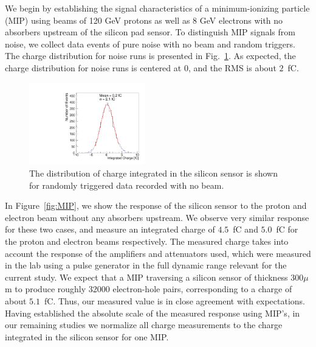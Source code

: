 \documentclass[12pt]{article}
\begin{document}
{We begin by establishing the signal characteristics of a minimum-ionizing
particle (MIP) using beams of 120 GeV protons as well as 8 GeV electrons with no
absorbers upstream of the silicon pad sensor. To distinguish MIP signals from
noise, we collect data events of pure noise with no beam and random triggers.
The charge distribution for noise runs is presented in
Fig.~\ref{fig:noise}. As expected, the charge distribution for noise
runs is centered at 0, and the RMS is about $2$~fC. 

\begin{figure}[htbp] 
\centering
\includegraphics[width=0.45\textwidth]{plots/NoiseNoBeam_charge.pdf} 
\caption{The distribution of charge integrated in the silicon sensor is shown for randomly triggered 
data recorded with no beam. } 
\label{fig:noise} 
\end{figure} 

In Figure~\ref{fig:MIP}, we show the response of the silicon sensor to
the proton and electron beam without any absorbers upstream. We observe very similar
response for these two cases, and measure an integrated charge of $4.5$~fC and $5.0$~fC
for the proton and electron beams respectively. The measured charge takes into account
the response of the amplifiers and attenuators used, which were measured 
in the lab using a pulse generator in the full dynamic range relevant for the current study.
We expect that a MIP traversing a silicon sensor of thickness 300$\mu$m to produce roughly 32000 
electron-hole pairs, corresponding to a charge of about $5.1$~fC. Thus, our measured value
is in close agreement with expectations. Having established the absolute scale of the measured 
response using MIP's, in our remaining studies we normalize all charge measurements to the 
charge integrated in the silicon sensor for one MIP. 

}
\end{document}
